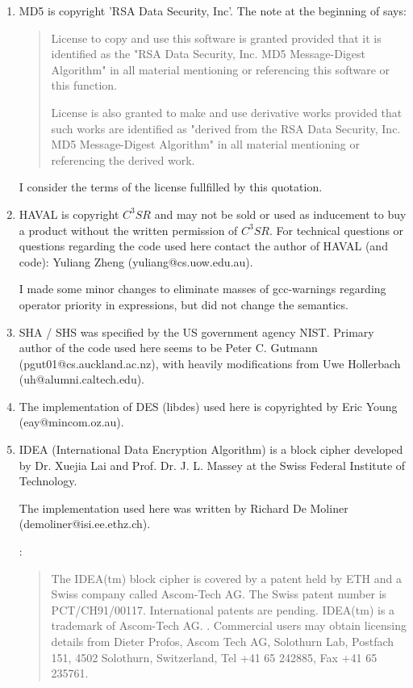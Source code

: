 \begin {enumerate}
\item	MD5 is copyright 'RSA Data Security, Inc'. The note at the
	beginning of  says:

	\begin {quotation}
		License to copy and use this software is granted
		provided that it is identified as the "RSA Data
		Security, Inc. MD5 Message-Digest Algorithm" in all
		material mentioning or referencing this software or
		this function.
                                                                  
		License is also granted to make and use derivative
		works provided that such works are identified as
		"derived from the RSA Data Security, Inc. MD5
		Message-Digest Algorithm" in all material mentioning
		or referencing the derived work.
	\end   {quotation}

	I consider the terms of the license fullfilled by this
	quotation. 

\item	HAVAL is copyright $C^3SR$ and may not be sold or used as
	inducement to buy a product without the written permission of
	$C^3SR$. For technical questions or questions regarding the
	code used here contact the author of HAVAL (and code): Yuliang
	Zheng (yuliang@cs.uow.edu.au).

	I made some minor changes to eliminate masses of \cmd
	{gcc}-warnings regarding operator priority in expressions, but
	did not change the semantics.


\item	SHA / SHS was specified by the US government agency
	NIST. Primary author of the code used here seems to be Peter
	C. Gutmann (pgut01@cs.auckland.ac.nz), with heavily
	modifications from Uwe Hollerbach (uh@alumni.caltech.edu).

\item	The implementation of DES (libdes) used here is copyrighted by
	Eric Young (eay@mincom.oz.au).

\item	IDEA (International Data Encryption Algorithm) is a block
	cipher developed  by  Dr.  Xuejia  Lai  and
	Prof. Dr. J. L. Massey at the Swiss Federal Institute of
	Technology.

	The implementation used here was written by Richard De Moliner
	(demoliner@isi.ee.ethz.ch).

	:
	\begin {quotation}
		The IDEA(tm) block cipher is covered by a patent held
		by ETH and a Swiss company called Ascom-Tech AG.  The
		Swiss patent number is PCT/CH91/00117.  International
		patents are pending. IDEA(tm) is a trademark of
		Ascom-Tech AG.  .  Commercial users may obtain
		licensing details from Dieter Profos, Ascom Tech AG,
		Solothurn Lab, Postfach 151, 4502 Solothurn,
		Switzerland, Tel +41 65 242885, Fax +41 65 235761. 
	\end {quotation}


\end{enumerate}
